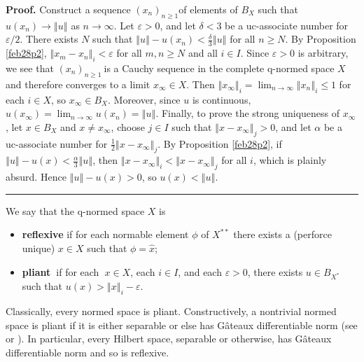 \documentclass[11pt]{article}%
\newenvironment{proof}[1][Proof]{\noindent\textbf{#1.} }{\ \rule{0.5em}{0.5em}}
\begin{document}
\begin{proof}
Construct a sequence $\left(  x_{n}\right)  _{n\geq1}$of elements of $B_{X}$
such that $u(x_{n})\rightarrow\left\Vert u\right\Vert $ as $n\rightarrow
\infty$. Let $\varepsilon>0$, and let $\delta<3$ be a uc-associate number for
$\varepsilon/2$. There exists $N$ such that $\left\Vert u\right\Vert
-u(x_{n})<\frac{\delta}{3}\left\Vert u\right\Vert $ for all $n\geq N$. By
Proposition \ref{feb28p2}, $\left\Vert x_{m}-x_{n}\right\Vert _{i}%
<\varepsilon$ for all $m,n\geq N$ and all $i\in I$. Since $\varepsilon>0$ is
arbitrary, we see that $\left(  x_{n}\right)  _{n\geq1}\ $is a Cauchy sequence
in the complete q-normed space $X$ and therefore converges to a limit
$x_{\infty}\in X$. Then $\left\Vert x_{\infty}\right\Vert _{i}=\lim
_{n\rightarrow\infty}\left\Vert x_{n}\right\Vert _{i}\leq1$ for each $i\in X$,
so $x_{\infty}\in B_{X}$. Moreover, since $u$ is continuous, $u(x_{\infty
})=\lim_{n\rightarrow\infty}u(x_{n})=\left\Vert u\right\Vert $. Finally, to
prove the strong uniqueness of $x_{\infty}$, let $x\in B_{X}$ and $x\neq
x_{\infty}$, choose $j\in I$ such that $\left\Vert x-x_{\infty}\right\Vert
_{j}>0$, and let $\alpha$ be a uc-associate number for $\frac{1}{2}\left\Vert
x-x_{\infty}\right\Vert _{j}$. By Proposition \ref{feb28p2}, if $\left\Vert
u\right\Vert -u(x)<\frac{\alpha}{3}\left\Vert u\right\Vert $, then $\left\Vert
x-x_{\infty}\right\Vert _{i}<\left\Vert x-x_{\infty}\right\Vert _{j}$ for all
$i$, which is plainly absurd. Hence $\left\Vert u\right\Vert -u(x)>0$, so
$u(x)<\left\Vert u\right\Vert $.
\end{proof}

%

\medskip


We say that the q-normed space $X$ is

\begin{itemize}
\item \textbf{reflexive} if for each normable element $\phi$ of $X^{\ast\ast}$
there exists a (perforce unique) $x\in X$ such that $\phi=\widehat{x}$;

\item \textbf{pliant\ }if for each\textbf{\ }$x\in X$, each $i\in I$, and each
$\varepsilon>0$, there exists $u\in B_{X^{\ast}}$ such that $u(x)>\left\Vert
x\right\Vert _{i}-\varepsilon$.
\end{itemize}

%

\noindent
Classically, every normed space is pliant. Constructively, a nontrivial normed
space is pliant if it is either separable \cite[5.3.1]{BVtech} or else has
G\^{a}teaux differentiable norm (see \cite[Lemma 1]{Ishihara} or
\cite[5.3.6]{BVtech}). In particular, every Hilbert space, separable or
otherwise, has G\^{a}teaux differentiable norm and so is reflexive.
\end{document}
